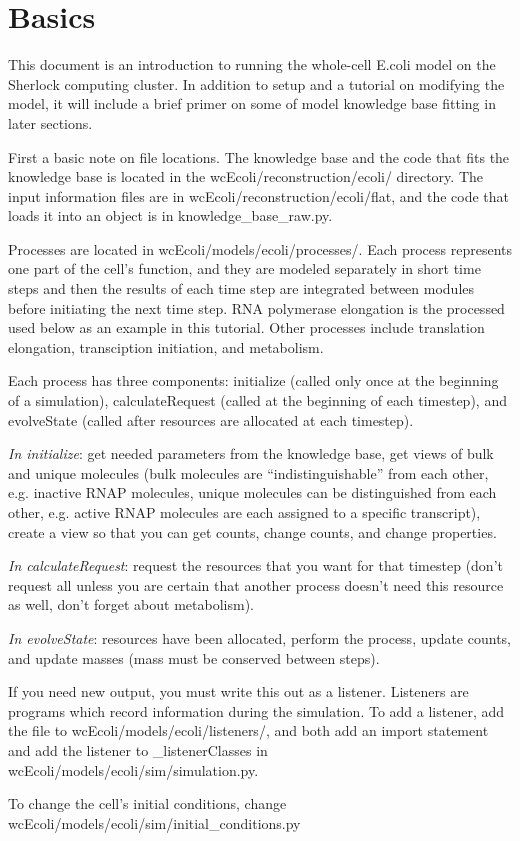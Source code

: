 \documentclass[12pt]{article}
\begin{document}
\maketitle

\section{Basics}

This document is an introduction to running the whole-cell E.coli model on the Sherlock computing cluster. In addition to setup and a tutorial on modifying the model, it will include a brief primer on some of model knowledge base fitting in later sections.
\par
First a basic note on file locations. The knowledge base and the code that fits the knowledge base is located in the wcEcoli/reconstruction/ecoli/ directory. The input information files are in wcEcoli/reconstruction/ecoli/flat, and the code that loads it into an object is in knowledge\_base\_raw.py.
\par

Processes are located in wcEcoli/models/ecoli/processes/. Each process represents one part of the cell's function, and they are modeled separately in short time steps and then the results of each time step are integrated between modules before initiating the next time step. RNA polymerase elongation is the processed used below as an example in this tutorial. Other processes include translation elongation, transciption initiation, and metabolism.
\par
Each process has three components: initialize (called only once at the beginning of a simulation), calculateRequest (called at the beginning of each timestep), and evolveState (called after resources are allocated at each timestep).
\par
\emph{In initialize}: get needed parameters from the knowledge base, get views of bulk and unique molecules (bulk molecules are “indistinguishable” from each other, e.g. inactive RNAP molecules, unique molecules can be distinguished from each other, e.g. active RNAP molecules are each assigned to a specific transcript), create a view so that you can get counts, change counts, and change properties.
\par
\emph{In calculateRequest}: request the resources that you want for that timestep (don’t request all unless you are certain that another process doesn’t need this resource as well, don’t forget about metabolism).
\par
\emph{In evolveState}: resources have been allocated, perform the process, update counts, and update masses (mass must be conserved between steps).
\par
If you need new output, you must write this out as a listener. Listeners are programs which record information during the simulation. To add a listener, add the file to wcEcoli/models/ecoli/listeners/, and both add an import statement and add the listener to \_listenerClasses in wcEcoli/models/ecoli/sim/simulation.py.
\par
To change the cell’s initial conditions, change wcEcoli/models/ecoli/sim/initial\_conditions.py
\par
\end{document}
